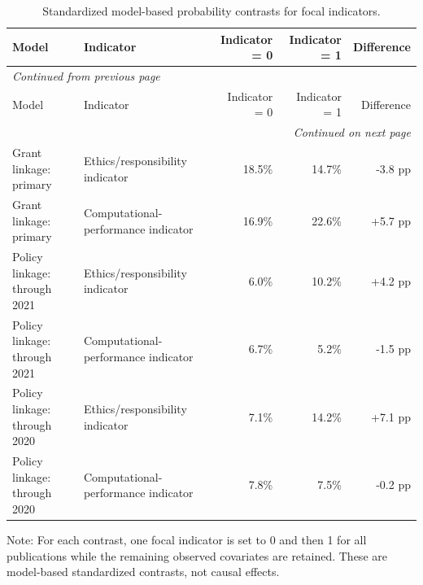 \documentclass[11pt]{article}
\begin{document}
\begin{longtable}{p{4.5cm}p{3.9cm}rrr}
\caption{Standardized model-based probability contrasts for focal indicators.}\label{tab:s5-probability-contrasts}\\
\toprule
Model & Indicator & Indicator = 0 & Indicator = 1 & Difference \\
\midrule
\endfirsthead
\multicolumn{5}{l}{\small\itshape Continued from previous page} \\
\toprule
Model & Indicator & Indicator = 0 & Indicator = 1 & Difference \\
\midrule
\endhead
\midrule
\multicolumn{5}{r}{\small\itshape Continued on next page} \\
\endfoot
\bottomrule
\endlastfoot
Grant linkage: primary & Ethics/responsibility indicator & 18.5\% & 14.7\% & -3.8 pp \\
Grant linkage: primary & Computational-performance indicator & 16.9\% & 22.6\% & +5.7 pp \\
Policy linkage: through 2021 & Ethics/responsibility indicator & 6.0\% & 10.2\% & +4.2 pp \\
Policy linkage: through 2021 & Computational-performance indicator & 6.7\% & 5.2\% & -1.5 pp \\
Policy linkage: through 2020 & Ethics/responsibility indicator & 7.1\% & 14.2\% & +7.1 pp \\
Policy linkage: through 2020 & Computational-performance indicator & 7.8\% & 7.5\% & -0.2 pp \\
\end{longtable}

\noindent\small Note: For each contrast, one focal indicator is set to 0 and then 1 for all publications while the remaining observed covariates are retained. These are model-based standardized contrasts, not causal effects.
\end{document}
